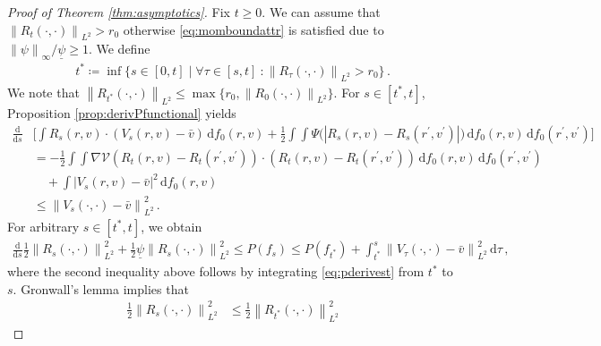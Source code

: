 \documentclass[11pt]{article}
\newcommand{\dx}[1]{\frac{\mathrm{d}}{\mathrm{d}#1}}
\newcommand{\norm}[1]{\left\| #1 \right\|}
\newcommand{\abs}[1]{\left| #1 \right|}
\newcommand{\msolinit}[1]{f_0(#1)}
\newcommand{\charX}[2]{R_{#1}(#2) }
\newcommand{\charV}[2]{V_{#1}(#2)}
\newcommand{\Pfunc}{P}
\begin{document}
\begin{bibunit}[unsrtnat]
   \begin{proof}[Proof of Theorem \ref{thm:asymptotics}] 
         Fix $t \geq 0$. We can assume that $\norm{\charX{t}{\cdot,\cdot } }_{L^{2}} > r_0$ otherwise \eqref{eq:momboundattr} is satisfied due to $\norm{\psi}_\infty / {\underline{\psi}} \geq 1$. We define 
        \begin{align*}
            t^* \coloneq \inf \{ s \in [0,t] \mid \forall \tau \in [s,t] \ \colon \norm{\charX{\tau}{\cdot,\cdot}}_{L^2} > r_0 \}  \, . 
        \end{align*}
        We note that $\norm{\charX{t^*}{\cdot, \cdot}}_{L^2} \leq \max\{ r_0, \norm{\charX{0}{\cdot, \cdot} }_{L^{2}} \} $. For $s \in [t^*, t]$, Proposition \ref{prop:derivPfunctional} yields 
        \begin{align}
            \dx{s}& \Big[ \int \charX{s}{r,v} \cdot (\charV{s}{r,v}-\bar{v}) \, \mathrm{d}\msolinit{r,v} \nonumber 
            + \frac{1}{2} \int \int \Psi \big(\abs{\charX{s}{r,v}- \charX{s}{r^\prime,v^\prime} } \big) \, \mathrm{d}\msolinit{r,v} \, \mathrm{d}\msolinit{r^\prime, v^\prime} \Big] \nonumber \\ 
            &= 
            - \frac{1}{2} \int \int \nabla \mathcal{V}(\charX{t}{r,v} - \charX{t}{r^\prime, v^\prime} ) \cdot (\charX{t}{r,v} - \charX{t}{r^\prime, v^\prime}  ) \, \mathrm{d}\msolinit{r,v} \, \mathrm{d}\msolinit{r^\prime, v^\prime} \nonumber \\
            &\quad + \int \abs{\charV{s}{r,v} - \bar{v}}^{2} \, \mathrm{d}\msolinit{r,v} \nonumber  \\
            &\leq \norm{\charV{s}{\cdot,\cdot} - \bar{v}}^{2}_{L^{2}} \, . \label{eq:pderivest}
        \end{align}
        For arbitrary $s \in [t^* , t]$, we obtain 
        \begin{align*}
            \dx{s} \frac{1}{2} \norm{\charX{s}{\cdot, \cdot} }_{L^{2}}^{2} 
            + \frac{1}{2} \underline{\psi} \norm{\charX{s}{\cdot, \cdot} }_{L^{2}}^{2}  
            \leq \Pfunc(f_s)
            \leq 
            \Pfunc (f_{t^*}) + \int_{t^{*}}^{s} \norm{\charV{\tau}{\cdot,\cdot} - \bar{v}}^{2}_{L^{2}} \, \mathrm{d}\tau \, , 
        \end{align*}
        where the second inequality above follows by integrating \eqref{eq:pderivest} from $t^*$ to $s$. Gronwall's lemma implies that 
        \begin{align}
            \frac{1}{2} \norm{\charX{s}{\cdot, \cdot} }_{L^{2}}^{2} &\leq \frac{1}{2} \norm{\charX{t^*}{\cdot, \cdot} }_{L^{2}}^{2}

\end{align}
\end{proof}
\end{bibunit}
\end{document}

